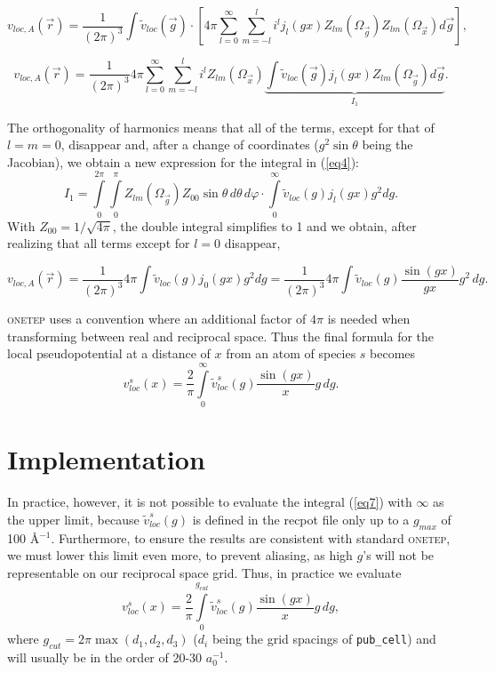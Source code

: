 \documentclass[a4paper,oneside,11pt]{article}
\newcommand{\onetep}{\textsc{onetep}}
\newcommand{\vlocxs}{v^s_{loc}\left(x\right)}
\newcommand{\vlocAr}{v_{loc,A}\left(\vec{r}\right)}
\newcommand{\vlocg}{\tilde{v}_{loc}\left(\vec{g}\right)}
\newcommand{\vlocgscalar}{\tilde{v}_{loc}\left(g\right)}
\newcommand{\vlocgs}{\tilde{v}^s_{loc}\left(g\right)}
\begin{document}
\begin{equation}
\vlocAr = 
\frac{1}{{\left(2\pi\right)}^{3}}
\int \vlocg \cdot \left[ 4\pi 
\sum_{l=0}^{\infty}
\sum_{m=-l}^{l} i^l 
j_l\left( gx\right)
Z_{lm}\left(\Omega_{\vec{g}}\right)
Z_{lm}\left(\Omega_{\vec{x}}\right)
d\vec{g}
\right],
\end{equation}

\begin{equation}
\vlocAr = 
\frac{1}{{\left(2\pi\right)}^{3}}
4\pi
\sum_{l=0}^{\infty}
\sum_{m=-l}^{l} i^l 
Z_{lm}\left(\Omega_{\vec{x}}\right)
\underbrace{
\int \vlocg j_l\left( gx\right)
Z_{lm}\left(\Omega_{\vec{g}}\right)
d\vec{g}}_{I_1}.
\label{eq4}
\end{equation}

The orthogonality of harmonics means that all of the terms, except for that of $l=m=0$, disappear and, after a change of coordinates ($g^2\sin{\theta}$ being the Jacobian), we obtain a new expression for the integral in (\ref{eq4}):
\begin{equation}
I_1=
\int\limits_{0}^{2\pi}
\int\limits_{0}^{\pi}
Z_{lm}\left(\Omega_{\vec{g}}\right)
Z_{00}
\sin{\theta}\,d\theta\,d\varphi
\cdot\int\limits_{0}^{\infty}\vlocgscalar{}j_l\left( gx\right)g^2 dg.
\end{equation}
With $Z_{00}=1/{\sqrt{4\pi}}$, the double integral simplifies to 1 and we obtain, after realizing that all terms except for $l=0$ disappear,

\begin{equation}
\vlocAr = 
\frac{1}{{\left(2\pi\right)}^{3}}
4\pi
\int \vlocgscalar j_0\!\left( gx\right)g^2 dg
=
\frac{1}{{\left(2\pi\right)}^{3}}
4\pi
\int \vlocgscalar \frac{\sin\left( g	x\right)}{gx}g^2\,dg.
\end{equation}

\onetep{} uses a convention where an additional factor of $4\pi$ is needed when transforming between real and reciprocal space. Thus the final formula for the local pseudopotential at a distance of $x$ from an atom of species $s$ becomes 
\begin{equation}
\vlocxs = \frac{2}{\pi}\int\limits_0^{\infty}
\vlocgs \frac{\sin\left(gx\right)}{x}g\,dg.
\label{eq7}
\end{equation}

\section{Implementation}
In practice, however, it is not possible to evaluate the integral (\ref{eq7}) with $\infty$ as the upper limit, because $\vlocgs$ is defined in the recpot file only up to a $g_{max}$ of 100 \AA{}$^{-1}$. Furthermore, to ensure the results are consistent with standard \onetep{}, we must lower this limit even more, to prevent aliasing, as high $g$'s will not be representable on our reciprocal space grid. Thus, in practice we evaluate
\begin{equation}
\vlocxs = \frac{2}{\pi}\int\limits_0^{g_{cut}}
\vlocgs \frac{\sin\left(gx\right)}{x}g\,dg,
\label{eq8}
\end{equation}
where $g_{cut}=2\pi\max{\left(d_1,d_2,d_3\right)}$ ($d_i$ being the grid spacings of \texttt{pub\_cell}) and will usually be in the order of 20-30 $a_0^{-1}$.
\end{document}
